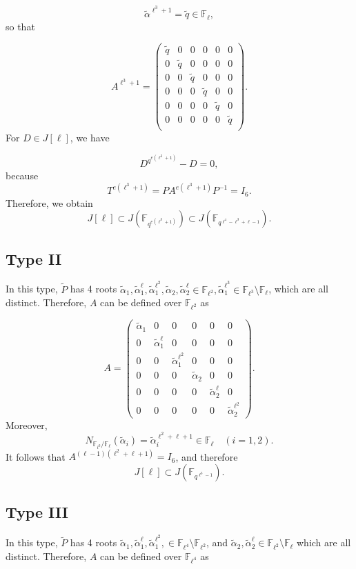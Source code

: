 \documentclass[11pt,a4paper]{article}
\theoremstyle{plain}
\theoremstyle{definition}
\theoremstyle{remark}
\begin{document}
\[
\tilde{\alpha}^{\ell^3+1} = \tilde{q} \in \mathbb{F}_\ell,
\]
so that

\[
A^{\ell^3+1} =
\begin{pmatrix}
\tilde{q} & 0 & 0 & 0 & 0 & 0\\
0 & \tilde{q} & 0 & 0 & 0 & 0\\
0 & 0 & \tilde{q} & 0 & 0 & 0\\
0 & 0 & 0 & \tilde{q} & 0 & 0\\
0 & 0 & 0 & 0 & \tilde{q} & 0\\
0 & 0 & 0 & 0 & 0 & \tilde{q} \\
\end{pmatrix}.
\]
For \(D \in J[\ell]\), we have

\[
D^{q^{e(\ell^3+1)}} - D = 0,
\]
because
\[
T^{e(\ell^3+1)} = P A^{e(\ell^3+1)} P^{-1} = I_6.
\]
Therefore, we obtain
\[
J[\ell] \subset J(\mathbb{F}_{q^{e(\ell^3+1)}}) \subset J(\mathbb{F}_{q^{\ell^4 - \ell^3 + \ell - 1}}).
\]

\subsection*{Type II}
In this type, \(\tilde{P}\) has 4 roots
\(\tilde{\alpha}_1, \tilde{\alpha}_1^\ell, \tilde{\alpha}_1^{\ell^2}, \tilde{\alpha}_2, \tilde{\alpha}_2^\ell\in \mathbb{F}_{\ell^2},\tilde{\alpha}_1^{\ell^3}\in \mathbb{F}_{\ell^3} \setminus \mathbb{F}_\ell\),
which are all distinct.  
Therefore, \(A\) can be defined over \(\mathbb{F}_{\ell^2}\) as

\[
A =
\begin{pmatrix}
\tilde{\alpha}_1 & 0 & 0 & 0 & 0 & 0\\
0 & \tilde{\alpha}_1^\ell & 0 & 0 & 0 & 0\\
0 & 0 & \tilde{\alpha}_1^{\ell^2} & 0 & 0 & 0\\
0 & 0 & 0 & \tilde{\alpha}_2 & 0 & 0\\
0 & 0 & 0 & 0 & \tilde{\alpha}_2^\ell & 0\\
0 & 0 & 0 & 0 & 0 & \tilde{\alpha}_2^{\ell^2}
\end{pmatrix}.
\]
Moreover,
\[
N_{\mathbb{F}_{l^3}/\mathbb{F}_\ell}(\tilde{\alpha}_i) = \tilde{\alpha}_i^{\ell^2 + \ell + 1} \in \mathbb{F}_\ell
\quad (i = 1, 2).
\]
It follows that \(A^{(\ell - 1)(\ell^2 + \ell + 1)} = I_6\), and therefore
\[
J[\ell] \subset J(\mathbb{F}_{q^{\ell^3 - 1}}).
\]


\subsection*{Type III}
In this type, \(\tilde{P}\) has 4 roots 
\(\tilde{\alpha}_1, \tilde{\alpha}_1^\ell, \tilde{\alpha}_1^{\ell^2}, \in \mathbb{F}_{\ell^4} \setminus \mathbb{F}_{\ell^2}\), and $\tilde{\alpha}_2, \tilde{\alpha}_2^\ell \in \mathbb{F}_{\ell^2} \setminus \mathbb{F}_{\ell}$ 
which are all distinct.  
Therefore, \(A\) can be defined over \(\mathbb{F}_{\ell^4}\) as
\end{document}
